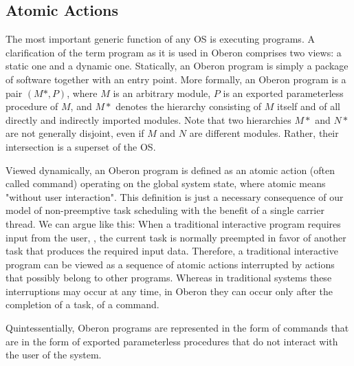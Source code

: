 \subsection{Atomic Actions}
The most important generic function of any OS is executing programs. A clarification
of the term program as it is used in Oberon comprises two views: a static one and a dynamic one.
Statically, an Oberon program is simply a package of software together with an entry point. More
formally, an Oberon program is a pair $(M*, P)$, where $M$ is an arbitrary module, $P$ is an exported
parameterless procedure of $M$, and $M*$ denotes the hierarchy consisting of $M$ itself and of all
directly and indirectly imported modules. Note that two hierarchies $M*$ and $N*$ are not generally
disjoint, even if $M$ and $N$ are different modules. Rather, their intersection is a superset of the OS.

Viewed dynamically, an Oberon program is defined as an atomic action (often called command)
operating on the global system state, where atomic means "without user interaction". This
definition is just a necessary consequence of our model of non-preemptive task scheduling with
the benefit of a single carrier thread. We can argue like this: When a traditional interactive
program requires input from the user, , the current task is normally preempted in favor of another
task that produces the required input data. Therefore, a traditional interactive program can be
viewed as a sequence of atomic actions interrupted by actions that possibly belong to other
programs. Whereas in traditional systems these interruptions may occur at any time, in Oberon
they can occur only after the completion of a task, of a command.

Quintessentially, Oberon programs are represented in the form of commands that are in the form
of exported parameterless procedures that do not interact with the user of the system.

